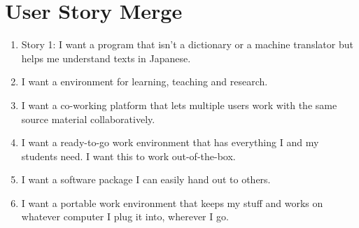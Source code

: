 \documentclass{article}
\begin{document}
\section{User Story Merge}
\begin{enumerate}
    \item Story 1: I want a program that isn't a dictionary or a machine translator but helps me understand texts in Japanese.
    \item I want a environment for learning, teaching and research.
    \item I want a co-working platform that lets multiple users work with the same source material collaboratively.
    \item I want a ready-to-go work environment that has everything I and my students need. I want this to work out-of-the-box.
    \item I want a software package I can easily hand out to others.
    \item I want a portable work environment that keeps my stuff and works on whatever computer I plug it into, wherever I go.
\end{enumerate}
\end{document}
